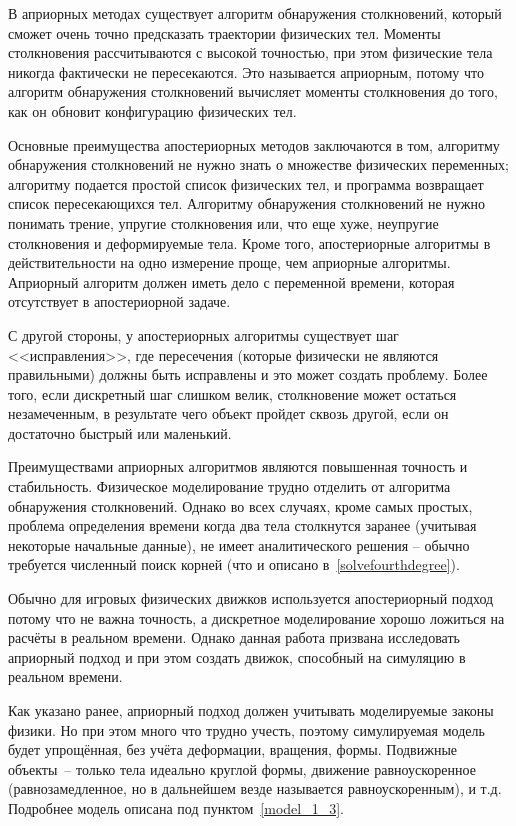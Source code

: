 В априорных методах существует алгоритм обнаружения столкновений, который сможет очень точно предсказать
траектории физических тел. Моменты столкновения рассчитываются с высокой точностью, при этом физические тела
никогда фактически не пересекаются. Это называется априорным, потому что алгоритм обнаружения столкновений
вычисляет моменты столкновения до того, как он обновит конфигурацию физических тел.

Основные преимущества апостериорных методов заключаются в том, алгоритму обнаружения
столкновений не нужно знать о множестве физических переменных; алгоритму подается простой список физических тел,
и программа возвращает список пересекающихся тел. Алгоритму обнаружения столкновений не нужно понимать трение,
упругие столкновения или, что еще хуже, неупругие столкновения и деформируемые тела. Кроме того, апостериорные
алгоритмы в действительности на одно измерение проще, чем априорные алгоритмы. Априорный алгоритм должен иметь дело
с переменной времени, которая отсутствует в апостериорной задаче.

С другой стороны, у апостериорных алгоритмы существует шаг <<исправления>>, где пересечения
(которые физически не являются правильными) должны быть исправлены и это может создать проблему.
Более того, если дискретный шаг слишком велик, столкновение может остаться незамеченным,
в результате чего объект пройдет сквозь другой, если он достаточно быстрый или маленький.

Преимуществами априорных алгоритмов являются повышенная точность и стабильность. Физическое моделирование
трудно отделить от алгоритма обнаружения столкновений. Однако во всех случаях, кроме самых простых,
проблема определения времени когда два тела столкнутся заранее (учитывая некоторые начальные данные),
не имеет аналитического решения -- обычно требуется численный поиск корней (что и описано в~\ref{solvefourthdegree}).

Обычно для игровых физических движков используется апостериорный подход потому что не важна точность,
а дискретное моделирование хорошо ложиться на расчёты в реальном времени.
Однако данная работа призвана исследовать априорный подход и при этом создать движок, способный на симуляцию в реальном времени.

Как указано ранее, априорный подход должен учитывать моделируемые законы физики. Но при этом много что трудно учесть, поэтому
симулируемая модель будет упрощённая, без учёта деформации, вращения, формы. Подвижные объекты~-- только тела идеально круглой формы,
движение равноускоренное (равнозамедленное, но в дальнейшем везде называется равноускоренным),
и т.д. Подробнее модель описана под пунктом~\ref{model_1_3}.

